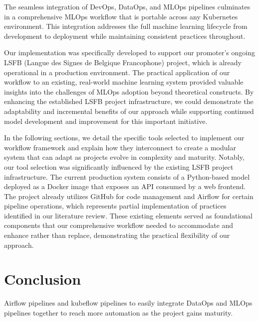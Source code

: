 The seamless integration of DevOps, DataOps, and MLOps pipelines culminates in a comprehensive MLOps workflow that is portable across any Kubernetes environment.
This integration addresses the full machine learning lifecycle from development to deployment while maintaining consistent practices throughout.

Our implementation was specifically developed to support our promoter's ongoing LSFB (Langue des Signes de Belgique Francophone) project, which is already operational in a production environment.
The practical application of our workflow to an existing, real-world machine learning system provided valuable insights into the challenges of MLOps adoption beyond theoretical constructs.
By enhancing the established LSFB project infrastructure, we could demonstrate the adaptability and incremental benefits of our approach while supporting continued model development and improvement for this important initiative.

In the following sections, we detail the specific tools selected to implement our workflow framework and explain how they interconnect to create a modular system that can adapt as projects evolve in complexity and maturity.
Notably, our tool selection was significantly influenced by the existing LSFB project infrastructure.
The current production system consists of a Python-based model deployed as a Docker image that exposes an API consumed by a web frontend.
The project already utilizes GitHub for code management and Airflow for certain pipeline operations, which represents partial implementation of practices identified in our literature review.
These existing elements served as foundational components that our comprehensive workflow needed to accommodate and enhance rather than replace, demonstrating the practical flexibility of our approach.



% 





\section{Conclusion}\label{sec:conclusion}
Airflow pipelines and kubeflow pipelines to easily integrate DataOps and MLOps pipelines together to reach more automation as the project gains maturity.
